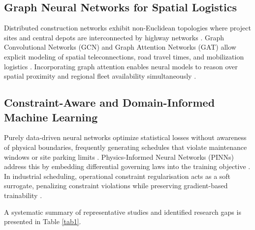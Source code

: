 \documentclass[pdflatex,sn-mathphys,Numbered]{sn-jnl}%
\begin{document}
\subsection{Graph Neural Networks for Spatial Logistics}
Distributed construction networks exhibit non-Euclidean topologies where project sites and central depots are interconnected by highway networks \cite{hussain2023}. Graph Convolutional Networks (GCN) and Graph Attention Networks (GAT) allow explicit modeling of spatial teleconnections, road travel times, and mobilization logistics \cite{liu2025,yadav2025}. Incorporating graph attention enables neural models to reason over spatial proximity and regional fleet availability simultaneously \cite{tao2025}.

\subsection{Constraint-Aware and Domain-Informed Machine Learning}
Purely data-driven neural networks optimize statistical losses without awareness of physical boundaries, frequently generating schedules that violate maintenance windows or site parking limits \cite{meng2025,cuomo2022}. Physics-Informed Neural Networks (PINNs) address this by embedding differential governing laws into the training objective \cite{cuomo2022}. In industrial scheduling, operational constraint regularisation acts as a soft surrogate, penalizing constraint violations while preserving gradient-based trainability \cite{wang2025}.

A systematic summary of representative studies and identified research gaps is presented in Table \ref{tab1}.
\end{document}
